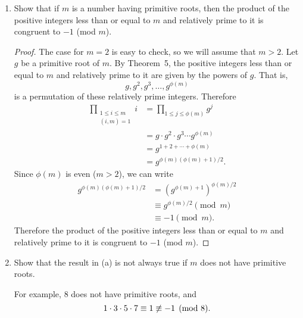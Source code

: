\begin{enumerate}
\item Show that if $m$ is a number having primitive roots, then the
  product of the positive integers less than or equal to $m$ and
  relatively prime to it is congruent to $-1$ (mod $m$).
  \begin{proof}
    The case for $m = 2$ is easy to check, so we will assume that
    $m > 2$. Let $g$ be a primitive root of $m$. By Theorem~5, the
    positive integers less than or equal to $m$ and relatively prime
    to it are given by the powers of $g$. That is,
    \begin{equation*}
      g, g^2, g^3, \dots, g^{\phi(m)}
    \end{equation*}
    is a permutation of these relatively prime integers. Therefore
    \begin{align*}
      \prod_{\substack{1\leq i\leq m \\ (i,m) = 1}}i
      &= \prod_{1\leq j\leq\phi(m)}g^j \\
      &= g\cdot g^2\cdot g^3\cdots g^{\phi(m)}\\
      &= g^{1+2+\cdots+\phi(m)} \\
      &= g^{\phi(m)(\phi(m)+1)/2}.
    \end{align*}
    Since $\phi(m)$ is even ($m > 2$), we can write
    \begin{align*}
      g^{\phi(m)(\phi(m)+1)/2}
      &= (g^{\phi(m)+1})^{\phi(m)/2} \\
      &\equiv g^{\phi(m)/2}\pmod{m} \\
      &\equiv -1 \pmod{m}.
    \end{align*}
    Therefore the product of the positive integers less than or equal
    to $m$ and relatively prime to it is congruent to $-1$ (mod $m$).
  \end{proof}
\item Show that the result in (a) is not always true if $m$ does not
  have primitive roots.
  \begin{solution}
    For example, $8$ does not have primitive roots, and
    \begin{equation*}
      1\cdot3\cdot5\cdot7\equiv1\not\equiv-1\pmod{8}. \qedhere
    \end{equation*}
  \end{solution}
\end{enumerate}
